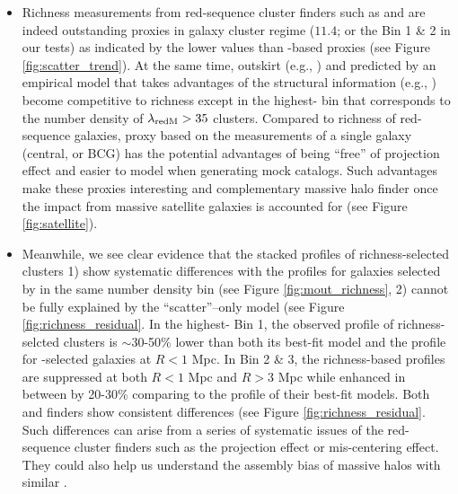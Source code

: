 \documentclass[a4paper,fleqn,usenatbib]{mnras}
\begin{document}
\begin{itemize}
        \item Richness measurements from red-sequence cluster finders such as \redm{} and \camira{} 
            are indeed outstanding \mvir{} proxies in galaxy cluster regime 
            (\logmh{}$11.4$; or the Bin 1 \& 2 in our tests) as indicated by the lower 
            \sigmh{} values than \mstar{}-based proxies (see Figure \ref{fig:scatter_trend}).
            At the same time, outskirt \mstar{} (e.g., ) and \mvir{} predicted 
            by an empirical model that takes advantages of the structural information (e.g.,
            \masap{}) become competitive to richness except in the highest-\mvir{} bin that 
            corresponds to the number density of $\lambda_{\rm redM} > 35$ clusters.
            Compared to richness of red-sequence galaxies, \mvir{} proxy based on the \mstar{}
            measurements of a single galaxy (central, or BCG) has the potential advantages of
            being ``free'' of projection effect and easier to model when generating mock catalogs.
            Such advantages make these proxies interesting and complementary massive halo finder 
            once the impact from massive satellite galaxies is accounted for 
            (see Figure \ref{fig:satellite}).
        
        \item Meanwhile, we see clear evidence that the stacked \dsigma{} profiles of 
            richness-selected clusters 
            1) show systematic differences with the profiles for 
            galaxies selected by \mstar{} in the same number density bin
            (see Figure \ref{fig:mout_richness},
            2) cannot be fully explained by the ``scatter''--only model
            (see Figure \ref{fig:richness_residual}.
            In the highest-\mvir{} Bin 1, the observed \dsigma{} profile of richness-selcted 
            clusters is $\sim 30$-50\% lower than both its best-fit model and the profile for 
            -selected galaxies at $R < 1$ Mpc.
            In Bin 2 \& 3, the richness-based \dsigma{} profiles are suppressed at both 
            $R < 1$ Mpc and $R > 3$ Mpc while enhanced in between by 20-30\% comparing to 
            the \dsigma{} profile of their best-fit models.
            Both \redm{} and \camira{} finders show consistent differences
            (see Figure \ref{fig:richness_residual}. 
            Such differences can arise from a series of systematic issues of the red-sequence 
            cluster finders such as the projection effect or mis-centering effect. 
            They could also help us understand the assembly bias of massive halos with 
            similar \mvir{}.

    \end{itemize}
\end{document}
